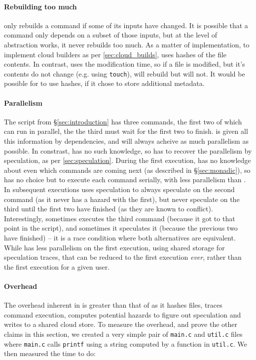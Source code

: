 \paragraph{Rebuilding too much} \Rattle only rebuilds a command if some of its inputs have changed. It is possible that a command only depends on a subset of those inputs, but at the level of abstraction \Rattle works, it never rebuilds too much. As a matter of implementation, to implement cloud builders as per \ref{sec:cloud_builds}, \Rattle uses hashes of the file contents. In contrast, \Make uses the modification time, so if a file is modified, but it's contents do not change (e.g. using \texttt{touch}), \Make will rebuild but \Rattle will not. It would be possible for \Make to use hashes, if it chose to store additional metadata.

\paragraph{Parallelism} The script from \S\ref{sec:introduction} has three commands, the first two of which can run in parallel, the the third must wait for the first two to finish. \Make is given all this information by dependencies, and will always acheive as much parallelism as possible. In constrast, \Rattle has no such knowledge, so has to recover the parallelism by speculation, as per \ref{sec:speculation}. During the first execution, \Rattle has no knowledge about even which commands are coming next (as described in \S\ref{sec:monadic}), so has no choice but to execute each command serially, with less parallelism than \Make. In subsequent executions \Rattle uses speculation to always speculate on the second command (as it never has a hazard with the first), but never speculate on the third until the first two have finished (as they are known to conflict). Interestingly, sometimes \Rattle executes the third command (because it got to that point in the script), and sometimes it speculates it (because the previous two have finished) -- it is a race condition where both alternatives are equivalent. While \Rattle has less parallelism on the first execution, using shared storage for speculation traces, that can be reduced to the first execution \emph{ever}, rather than the first execution for a given user.

\paragraph{Overhead} The overhead inherent in \Rattle is greater than that of \Make as it hashes files, traces command execution, computes potential hazards to figure out speculation and writes to a shared cloud store. To measure the overhead, and prove the other claims in this section, we created a very simple pair of \texttt{main.c} and \texttt{util.c} files where \texttt{main.c} calls \texttt{printf} using a string computed by a function in \texttt{util.c}. We then measured the time to do:

